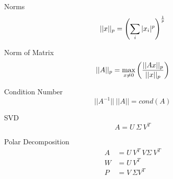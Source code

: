 \documentclass[12pt]{article}
\begin{document}
\begin{multicols}{3}
\begin{theoryBox}
	{Norms}
	$$
	\vert\vert x \vert\vert_p  =\left (\sum_{i}^{} \vert x_i \vert^p \right)^{1 \over p}
	$$
\end{theoryBox}

\begin{theoryBox}
	{Norm of Matrix}
	$$
	\vert\vert A \vert\vert_p = \max_{x \ne 0} \left( {{\vert\vert Ax \vert\vert_p} \over {\vert\vert x \vert\vert_p}} \right)
	$$
\end{theoryBox}




\begin{theoryBox}
	{Condition Number}
$$
\vert\vert A^{-1} \vert\vert ~ \vert\vert A \vert\vert = cond(A)
$$
\end{theoryBox}

\begin{theoryBox}
	{SVD}
	$$
	A = U~ \Sigma~ V^T
	$$
\end{theoryBox}

\begin{theoryBox}
	{Polar Decomposition}
	\begin{align*}
		A &= U~ V^T~ V \Sigma~ V^T \\
		W &= U~ V^T \\
		P &= V~ \Sigma V^T \\
	\end{align*}
\end{theoryBox}














\end{multicols}
\end{document}
